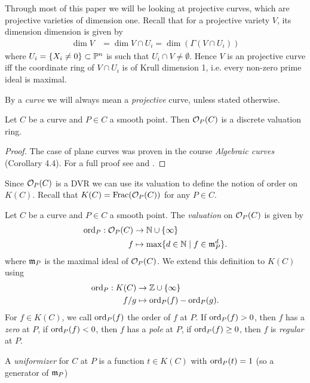 Through most of this paper we will be looking at projective curves, which
are projective varieties of dimension one. Recall that for a projective
variety $V$, its dimension dimension is given by
\begin{align*}
	\dim V &= \dim V\cap U_i = \dim(\Gamma(V\cap U_i))
\end{align*}
where $U_i = \{X_i \neq 0\} \subset \mathbb{P}^n$ is such that $U_i\cap V\neq
\emptyset$. Hence $V$ is an projective curve iff the coordinate ring
of $V \cap U_i$ is of Krull dimension 1, i.e. every non-zero prime
ideal is maximal.

By a \emph{curve} we will always mean a \emph{projective} curve, unless
stated otherwise.

\begin{proposition}
	Let $C$ be a curve and $P \in C$ a smooth point.
	Then $\mathcal{O}_P(C)$ is a discrete valuation ring.
\end{proposition}

\begin{proof}
	The case of plane curves was proven in the course \emph{Algebraic curves}
	(Corollary 4.4).
	For a full proof see \cite[I.5.1]{hartshorne} and \cite[9.2]{atiyah}.
\end{proof}

Since $\mathcal{O}_P(C)$ is a DVR we can use its valuation to define the
notion of order on $K(C)$. Recall that $K(C) = \operatorname{Frac}(\mathcal{O}_P(C))$ for
any $P \in C$.

\begin{definition}
	Let $C$ be a curve and $P \in C$ a smooth point. The \emph{valuation}
	on $\mathcal{O}_P(C)$ is given by
	\begin{align*}
		\operatorname{ord}_P: \mathcal{O}_P(C) &\to \mathbb{N}\cup\{\infty\}\\
		f &\mapsto \max\{d \in \mathbb{N} \mid f \in \mathfrak{m}_P^d\}.
	\end{align*}
	where $\mathfrak{m}_P$ is the maximal ideal of $\mathcal{O}_P(C)$.
	We extend this definition to $K(C)$ using
	\begin{align*}
		\operatorname{ord}_P: K(C) &\to \mathbb{Z}\cup\{\infty\}\\
		f/g &\mapsto \operatorname{ord}_P(f) - \operatorname{ord}_P(g).
	\end{align*}
	For $f \in K(C)$, we call $\operatorname{ord}_P(f)$ the order of $f$ at $P$.
	If $\operatorname{ord}_P(f) > 0$, then $f$ has a \emph{zero} at $P$,
	if $\operatorname{ord}_P(f) < 0$, then $f$ has a \emph{pole} at $P$,
	if $\operatorname{ord}_P(f) \geq 0$, then $f$ is \emph{regular} at $P$.
	
	A \emph{uniformizer} for $C$ at $P$ is a function $t \in K(C)$ with
	$\operatorname{ord}_P(t) = 1$ (so a generator of $\mathfrak{m}_P$)
\end{definition}

